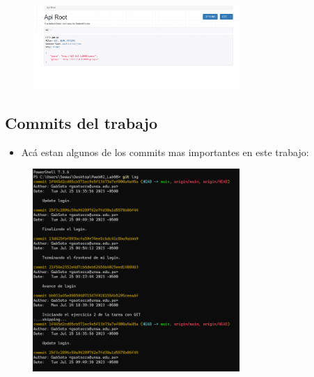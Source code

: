 \documentclass{article}
\begin{document}
	\begin{figure}[H]
		\centering
		\includegraphics[width=0.7\textwidth,keepaspectratio]{img/3.png}
	\end{figure}







	\subsection{Commits del trabajo}
	\begin{itemize}	
		\item Acá estan algunos de los commits mas importantes en este trabajo:
	\end{itemize}	
	
	\begin{figure}[H]
		\centering
		\includegraphics[width=0.7\textwidth,keepaspectratio]{img/Commits.png}
	\end{figure}
\end{document}
